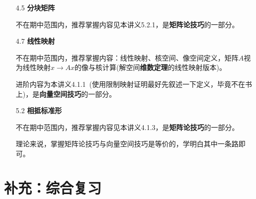 \documentclass[a4paper,UTF8,fontset=windows]{ctexart}
\newcommand*{\note}{\noindent *}
\begin{document}
\begin{enumerate}
    \item[4.5] \textbf{分块矩阵}
    
    不在期中范围内，推荐掌握内容见本讲义5.2.1，是\textbf{矩阵论技巧}的一部分。

    \item[4.7] \textbf{线性映射}
    
    不在期中范围内，推荐掌握内容：线性映射、核空间、像空间定义，矩阵$A$视为线性映射$x\to Ax$的像与核计算(解空间\textbf{维数定理}的线性映射版本)。
    
    进阶内容为本讲义4.1.1\ (使用限制映射证明最好先叙述一下定义，毕竟不在书上)，是\textbf{向量空间技巧}的一部分。

    \item[5.2]  \textbf{相抵标准形}
    
    不在期中范围内，推荐掌握内容见本讲义4.1.3，是\textbf{矩阵论技巧}的一部分。

    \note 理论来说，掌握矩阵论技巧与向量空间技巧是等价的，学明白其中一条路即可。
\end{enumerate}

\section{补充：综合复习}
\end{document}
